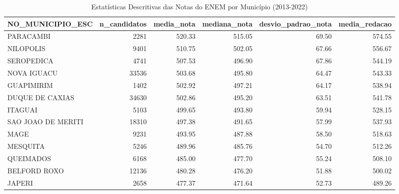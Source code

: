 \begin{table}
\caption{Estatísticas Descritivas das Notas do ENEM por Município (2013-2022)}
\label{tab:enem_desc}
\begin{tabular}{lrrrrr}
\toprule
NO_MUNICIPIO_ESC & n_candidatos & media_nota & mediana_nota & desvio_padrao_nota & media_redacao \\
\midrule
PARACAMBI & 2281 & 520.33 & 515.05 & 69.50 & 574.55 \\
NILOPOLIS & 9401 & 510.75 & 502.05 & 67.66 & 556.67 \\
SEROPEDICA & 4741 & 507.53 & 496.90 & 67.86 & 544.19 \\
NOVA IGUACU & 33536 & 503.68 & 495.80 & 64.47 & 543.33 \\
GUAPIMIRIM & 1402 & 502.92 & 497.21 & 64.17 & 538.94 \\
DUQUE DE CAXIAS & 34630 & 502.86 & 495.20 & 63.51 & 541.78 \\
ITAGUAI & 5103 & 499.65 & 493.80 & 59.94 & 528.15 \\
SAO JOAO DE MERITI & 18310 & 497.38 & 491.65 & 57.99 & 537.93 \\
MAGE & 9231 & 493.95 & 487.88 & 58.50 & 518.63 \\
MESQUITA & 5246 & 489.96 & 485.76 & 54.70 & 512.26 \\
QUEIMADOS & 6168 & 485.00 & 477.70 & 55.24 & 508.10 \\
BELFORD ROXO & 12136 & 480.28 & 476.20 & 51.88 & 500.02 \\
JAPERI & 2658 & 477.37 & 471.64 & 52.73 & 489.26 \\
\bottomrule
\end{tabular}
\end{table}
